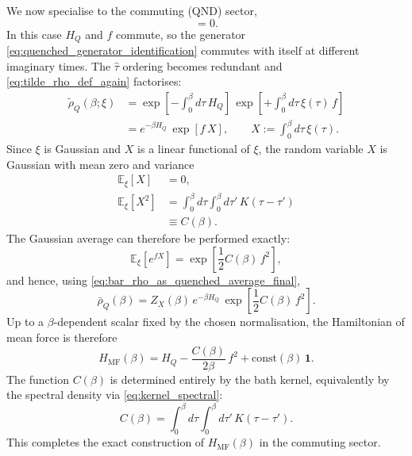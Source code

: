 We now specialise to the commuting (QND) sector,
\begin{equation}
    [H_Q,f]=0.
    \label{eq:commuting_here}
\end{equation}
In this case $H_Q$ and $f$ commute, so the generator \eqref{eq:quenched_generator_identification}
commutes with itself at different imaginary times. The $\hat\tau$ ordering becomes
redundant and \eqref{eq:tilde_rho_def_again} factorises:
\begin{align}
    \tilde\rho_Q(\beta;\xi)
    &=
    \exp\!\left[-\int_0^\beta d\tau\,H_Q\right]\,
    \exp\!\left[+\int_0^\beta d\tau\,\xi(\tau)\,f\right]
    \nonumber\\
    &=
    e^{-\beta H_Q}\,
    \exp\!\left[f\,X\right],
    \qquad
    X:=\int_0^\beta d\tau\,\xi(\tau).
    \label{eq:tilde_rho_commuting_factorised}
\end{align}
Since $\xi$ is Gaussian and $X$ is a linear functional of $\xi$, the random variable
$X$ is Gaussian with mean zero and variance
\begin{align}
    \mathbb E_\xi[X]&=0, \nonumber\\
    \mathbb E_\xi[X^2]
    &= \int_0^\beta d\tau\int_0^\beta d\tau'\,K(\tau-\tau')
    \nonumber\\
    &\equiv C(\beta).
    \label{eq:Cbeta_def}
\end{align}
The Gaussian average can therefore be performed exactly:
\begin{equation}
    \mathbb E_\xi\!\left[e^{f X}\right]
    =
    \exp\!\left[\frac{1}{2}C(\beta)\,f^2\right],
    \label{eq:gaussian_average_resummed}
\end{equation}
and hence, using \eqref{eq:bar_rho_as_quenched_average_final},
\begin{equation}
    \bar\rho_Q(\beta)
    =
    Z_X(\beta)\,e^{-\beta H_Q}\,\exp\!\left[\frac{1}{2}C(\beta)\,f^2\right].
    \label{eq:bar_rho_commuting_closed}
\end{equation}
Up to a $\beta$-dependent scalar fixed by the chosen normalisation, the Hamiltonian
of mean force is therefore
\begin{equation}
    H_{\mathrm{MF}}(\beta)
    =
    H_Q
    -\frac{C(\beta)}{2\beta}\,f^2
    +\mathrm{const}(\beta)\,\mathbf 1.
    \label{eq:HMF_commuting_final}
\end{equation}
The function $C(\beta)$ is determined entirely by the bath kernel, equivalently by
the spectral density via \eqref{eq:kernel_spectral}:
\begin{equation}
    C(\beta)=\int_0^\beta d\tau\int_0^\beta d\tau'\,K(\tau-\tau').
    \label{eq:Cbeta_kernel_moments}
\end{equation}
This completes the exact construction of $H_{\mathrm{MF}}(\beta)$ in the commuting sector.
